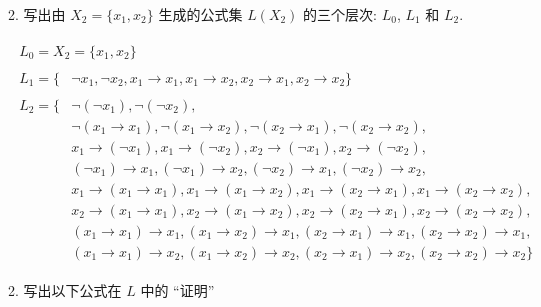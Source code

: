 \documentclass[boxes]{homework}
\begin{document}
\begin{problem}
2. 写出由 $X_2=\{x_1, x_2\}$ 生成的公式集 $L(X_2)$ 的三个层次: $L_0$, $L_1$ 和 $L_2$.
\end{problem}
\begin{solution}
    \begin{gather}
        \begin{aligned}
            L_0=X_2=\{x_1, x_2\}
        \end{aligned}\\
        \begin{aligned}
            L_1=\{ & \lnot x_1, \lnot x_2, x_1\to x_1, x_1 \to x_2, x_2\to x_1, x_2\to x_2\}
        \end{aligned}\\
        \begin{aligned}
            L_2=\{ & \lnot(\lnot x_1), \lnot(\lnot x_2),                                                  \\
                   & \lnot(x_1\to x_1), \lnot(x_1\to x_2), \lnot(x_2\to x_1), \lnot(x_2\to x_2),          \\
                   & x_1\to(\lnot x_1), x_1\to (\lnot x_2), x_2\to (\lnot x_1), x_2\to (\lnot x_2),       \\
                   & (\lnot x_1)\to x_1, (\lnot x_1)\to x_2, (\lnot x_2)\to x_1, (\lnot x_2)\to x_2,      \\
                   & x_1\to(x_1\to x_1), x_1\to(x_1\to x_2), x_1\to(x_2\to x_1), x_1\to(x_2\to x_2),      \\
                   & x_2\to(x_1\to x_1), x_2\to(x_1\to x_2), x_2\to(x_2\to x_1), x_2\to(x_2\to x_2),      \\
                   & (x_1\to x_1)\to x_1, (x_1\to x_2)\to x_1, (x_2\to x_1)\to x_1, (x_2\to x_2)\to x_1,  \\
                   & (x_1\to x_1)\to x_2, (x_1\to x_2)\to x_2, (x_2\to x_1)\to x_2, (x_2\to x_2)\to x_2\}
        \end{aligned}
    \end{gather}
\end{solution}
\begin{problem}
2. 写出以下公式在 $L$ 中的 ``证明''
\end{problem}
\end{document}
